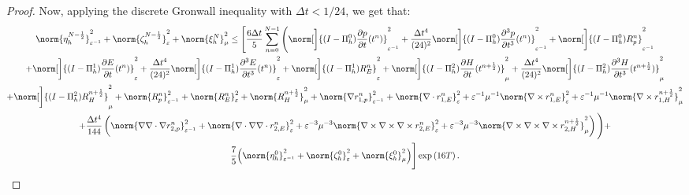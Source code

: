 \documentclass{amsart}
\theoremstyle{thmstyleone}%
\theoremstyle{thmstyletwo}%
\theoremstyle{thmstylethree}%
\begin{document}
\begin{proof}
Now, applying the discrete Gronwall inequality with $\Delta t < 1/24$, we get that:
\begin{multline*}
  \norm{\eta_h^{N - \frac{1}{2}}}^2_{\varepsilon^{-1}} + \norm{\zeta_h^{N - \frac{1}{2}}}^2_{\varepsilon} + \norm{\xi_h^N}^2_{\mu} \le \Bigg[ \dfrac{6 \Delta t}{5} \sum\limits_{n = 0}^{N - 1} \Bigg( \norm[\bigg]{(I - \Pi_h^0) \dfrac{\partial p}{\partial t}(t^n)}^2_{\varepsilon^{-1}} + \dfrac{\Delta t^4}{(24)^2} \norm[\bigg]{(I - \Pi_h^0) \dfrac{\partial^3 p}{\partial t^3}(t^n)}^2_{\varepsilon^{-1}} + \norm[\bigg]{(I - \Pi_h^0) R_p^n}^2_{\varepsilon^{-1}} \\
 + \norm[\bigg]{(I - \Pi_h^1) \dfrac{\partial E}{\partial t}(t^n)}^2_{\varepsilon} + \dfrac{\Delta t^4}{(24)^2} \norm[\bigg]{(I - \Pi_h^1) \dfrac{\partial^3 E}{\partial t^3}(t^n)}^2_{\varepsilon} + \norm[\bigg]{(I - \Pi_h^1) R_E^n}^2_{\varepsilon} + \norm[\bigg]{(I - \Pi_h^2) \dfrac{\partial H}{\partial t}(t^{n + \frac{1}{2}})}^2_\mu + \dfrac{\Delta t^4}{(24)^2} \norm[\bigg]{(I - \Pi_h^2) \dfrac{\partial^3 H}{\partial t^3}(t^{n + \frac{1}{2}})}^2_{\mu} \\ + \norm[\bigg]{(I - \Pi_h^2) R_H^{n + \frac{1}{2}}}^2_{\mu} +
  \norm{R_p^n}^2_{\varepsilon^{-1}} + \norm{R_E^n}^2_{\varepsilon} + \norm{R_H^{n + \frac{1}{2}}}^2_{\mu} + \norm{\nabla r_{1,p}^n} ^2_{\varepsilon^{-1}} + \norm{\nabla \cdot r_{1,E}^n}^2_{\varepsilon} + \varepsilon^{-1} \mu^{-1} \norm{\nabla \times r_{1,E}^n}^2_{\varepsilon} +  \varepsilon^{-1} \mu^{-1} \norm{\nabla \times r_{1,H}^{n + \frac{1}{2}}}^2_{\mu}  \\
+  \dfrac{\Delta t^4}{144} \left( \norm{\nabla \nabla \cdot \nabla r_{2,p}^n} ^2_{\varepsilon^{-1}} + \norm{\nabla \cdot \nabla \nabla \cdot r_{2,E}^n}^2_{\varepsilon} + \varepsilon^{-3} \mu^{-3} \norm{\nabla \times \nabla \times \nabla \times r_{2,E}^n}^2_{\varepsilon} +  \varepsilon^{-3} \mu^{-3} \norm{\nabla \times \nabla \times \nabla \times r_{2,H}^{n + \frac{1}{2}}}^2_{\mu} \right) \Bigg) + \\ \dfrac{7}{5} \Big( \norm{\eta_h^0}^2_{\varepsilon^{-1}} + \norm{\zeta_h^0}^2_{\varepsilon} + \norm{\xi_h^0}^2_{\mu} \Big) \Bigg] \exp \left( 16 T \right).
\end{multline*}


\end{proof}
\end{document}
